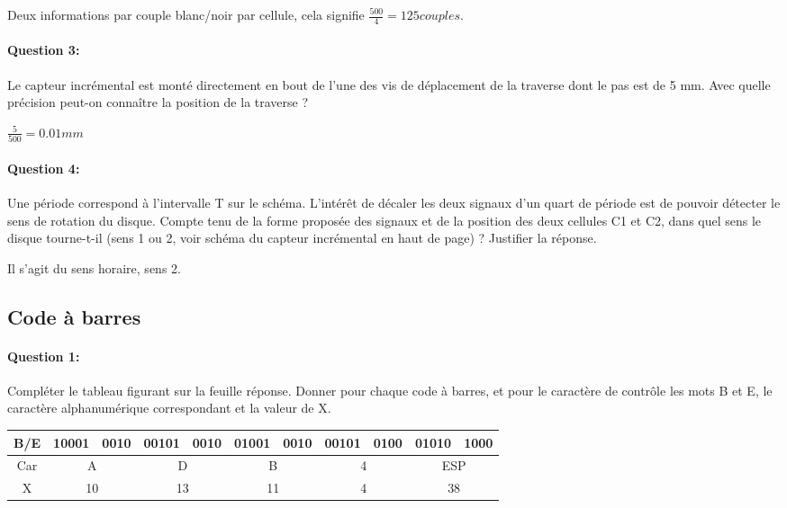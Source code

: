 Deux informations par couple blanc/noir par cellule, cela signifie $\frac{500}{4}=125 couples$.

\paragraph{Question 3:} Le capteur incrémental est monté directement en bout de l'une des vis de déplacement de la traverse dont le pas est de 5 mm. Avec quelle précision peut-on connaître la position de la traverse ?

$\frac{5}{500}=0.01mm$

\paragraph{Question 4:} Une période correspond à l'intervalle T sur le schéma. L'intérêt de décaler les deux signaux d'un quart de période est de pouvoir détecter le sens de rotation du disque. Compte tenu de la forme proposée des signaux et de la position des deux cellules C1 et C2, dans quel sens le disque tourne-t-il (sens 1 ou 2, voir schéma du capteur incrémental en haut de page) ? Justifier la réponse. 

Il s'agit du sens horaire, sens 2.

\subsection{Code à barres}

\paragraph{Question 1:} Compléter le tableau figurant sur la feuille réponse. Donner pour chaque code à barres, et pour le caractère de contrôle les mots B et E, le caractère alphanumérique correspondant et la valeur de X. 

\begin{center}
\begin{tabular}{|c|c|c|c|c|c|c|c|c|c|c|}
\hline
B/E & 10001 & 0010 & 00101 & 0010 & 01001 & 0010 & 00101 & 0100 & 01010 & 1000 \\
\hline
Car & \multicolumn{2}{c|}{A} & \multicolumn{2}{c|}{D} & \multicolumn{2}{c|}{B} & \multicolumn{2}{c|}{4} & \multicolumn{2}{c|}{ESP} \\
\hline
X & \multicolumn{2}{c|}{10} & \multicolumn{2}{c|}{13} & \multicolumn{2}{c|}{11} & \multicolumn{2}{c|}{4} & \multicolumn{2}{c|}{38} \\
\hline
\end{tabular}
\end{center}

